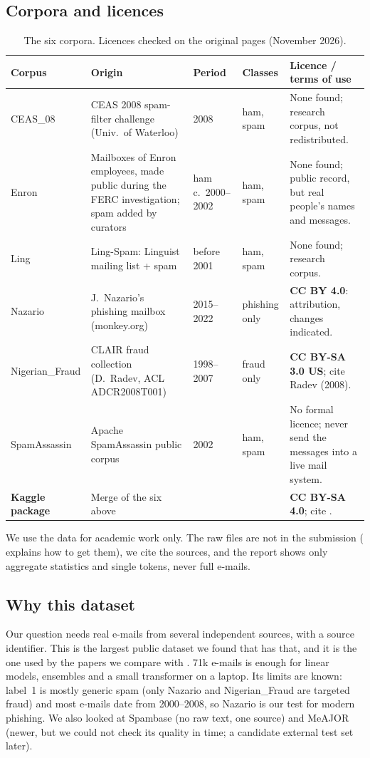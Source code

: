 \documentclass[11pt,a4paper]{article}
\begin{document}
\subsection{Corpora and licences}
\begin{table}[H]\centering\small
\caption{The six corpora. Licences checked on the original pages (November 2026).}\label{tab:licences}
\begin{adjustbox}{max width=\linewidth}
\begin{tabular}{L{2.5cm}L{4.4cm}L{1.9cm}L{1.6cm}L{6.4cm}}
\toprule
Corpus & Origin & Period & Classes & Licence / terms of use \\
\midrule
CEAS\_08 & CEAS 2008 spam-filter challenge (Univ.\ of Waterloo) & 2008 & ham, spam & None found; research corpus, not redistributed. \\
Enron & Mailboxes of Enron employees, made public during the FERC investigation; spam added by curators & ham c.\ 2000--2002 & ham, spam & None found; public record, but real people's names and messages. \\
Ling & Ling-Spam: Linguist mailing list + spam & before 2001 & ham, spam & None found; research corpus. \\
Nazario & J.~Nazario's phishing mailbox (monkey.org) & 2015--2022 & phishing only & \textbf{CC BY 4.0}: attribution, changes indicated. \\
Nigerian\_Fraud & CLAIR fraud collection (D.~Radev, ACL ADCR2008T001) & 1998--2007 & fraud only & \textbf{CC BY-SA 3.0 US}; cite Radev (2008). \\
SpamAssassin & Apache SpamAssassin public corpus & 2002 & ham, spam & No formal licence; never send the messages into a live mail system. \\
\midrule
\textbf{Kaggle package} & Merge of the six above & & & \textbf{CC BY-SA 4.0}; cite \cite{alsubaiey2024}. \\
\bottomrule
\end{tabular}
\end{adjustbox}
\end{table}
We use the data for academic work only. The raw files are not in the submission ( explains how to get them), we cite the sources, and the report shows only aggregate statistics and single tokens, never full e-mails.

\subsection{Why this dataset}
Our question needs real e-mails from several independent sources, with a source identifier. This is the largest public dataset we found that has that, and it is the one used by the papers we compare with \cite{alsubaiey2024,bhuiyan2026,ahmed2026}. 71k e-mails is enough for linear models, ensembles and a small transformer on a laptop. Its limits are known: label~1 is mostly generic spam (only Nazario and Nigerian\_Fraud are targeted fraud) and most e-mails date from 2000--2008, so Nazario is our test for modern phishing. We also looked at Spambase (no raw text, one source) and MeAJOR \cite{meajor2025} (newer, but we could not check its quality in time; a candidate external test set later).
\end{document}
